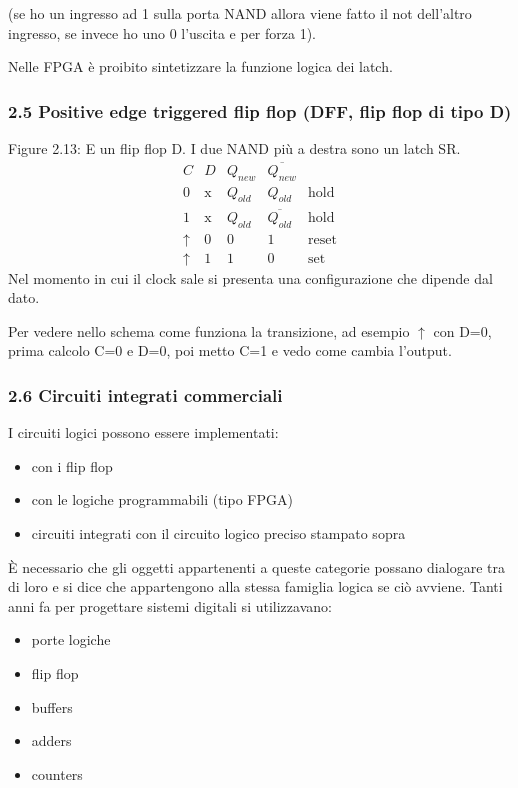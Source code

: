 \documentclass[
]{article}
\providecommand{\tightlist}{%
  \setlength{\itemsep}{0pt}\setlength{\parskip}{0pt}}
\begin{document}
(se ho un ingresso ad 1 sulla porta NAND allora viene fatto il not
dell'altro ingresso, se invece ho uno 0 l'uscita e per forza 1).

Nelle FPGA è proibito sintetizzare la funzione logica dei latch.

\subsubsection{2.5 Positive edge triggered flip flop (DFF, flip flop di
tipo
D)}\label{positive-edge-triggered-flip-flop-dff-flip-flop-di-tipo-d}

Figure 2.13: E un flip flop D. I due NAND più a destra sono un latch SR.
\[
\begin{array}{ccccc}
C&D&Q_{new}&\overline{Q_{new}}\\
\hline0&\text{x}&Q_{old}&Q_{old}&\text{hold}\\
1&\text{x}&Q_{old}&\overline{Q_{old}}&\text{hold}\\
\uparrow&0&0&1&\text{reset}\\
\uparrow&1&1&0&\text{set}
\end{array}
\] Nel momento in cui il clock sale si presenta una configurazione che
dipende dal dato.

Per vedere nello schema come funziona la transizione, ad esempio
\(\uparrow\) con D=0, prima calcolo C=0 e D=0, poi metto C=1 e vedo come
cambia l'output.

\subsubsection{2.6 Circuiti integrati
commerciali}\label{circuiti-integrati-commerciali}

I circuiti logici possono essere implementati:

\begin{itemize}
\tightlist
\item
  con i flip flop
\item
  con le logiche programmabili (tipo FPGA)
\item
  circuiti integrati con il circuito logico preciso stampato sopra
\end{itemize}

È necessario che gli oggetti appartenenti a queste categorie possano
dialogare tra di loro e si dice che appartengono alla stessa famiglia
logica se ciò avviene. Tanti anni fa per progettare sistemi digitali si
utilizzavano:

\begin{itemize}
\tightlist
\item
  porte logiche
\item
  flip flop
\item
  buffers
\item
  adders
\item
  counters
\end{itemize}
\end{document}
